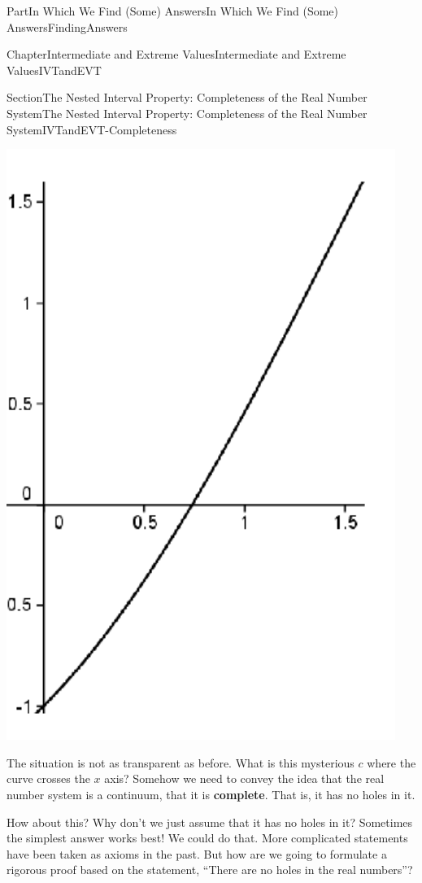 \documentclass[oneside,10pt,]{book}
\newcommand{\terminology}[1]{\textbf{#1}}
\numberwithin{equation}{part}
\begin{document}
\begin{partptx}{Part}{In Which We Find (Some) Answers}{}{In Which We Find (Some) Answers}{}{}{FindingAnswers}
\begin{chapterptx}{Chapter}{Intermediate and Extreme Values}{}{Intermediate and Extreme Values}{}{}{IVTandEVT}
\begin{sectionptx}{Section}{The Nested Interval Property: Completeness of the Real Number System}{}{The Nested Interval Property: Completeness of the Real Number System}{}{}{IVTandEVT-Completeness}
\begin{image}{0.315}{0.37}{0.315}{}
\includegraphics[width=\linewidth]{external/images/Ch6fig2-1.png}
\end{image}%
The situation is not as transparent as before.  What is this mysterious \(c\)  where the curve crosses the \(x\) axis?  Somehow we need to convey the idea that the real number system is a continuum, that it is \terminology{complete}.  That is, it has no holes in it.%
\par
How about this?  Why don't we just assume that it has no holes in it?  Sometimes the simplest answer works best! We could do that. More complicated statements have been taken as axioms in the past. But how are we going to formulate a rigorous proof based on the statement, ``There are no holes in the real numbers''?%
\par

\end{sectionptx}
\end{chapterptx}
\end{partptx}
\end{document}
